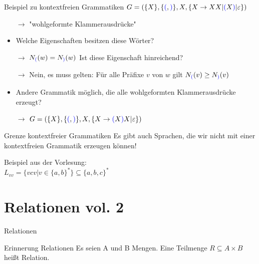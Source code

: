 \begin{frame}{Beispiel zu kontextfreien Grammatiken}
	$G= (\{X\}, \{\textcolor{blue}{(}, \textcolor{blue}{)}\}, X, \{X \rightarrow XX|\textcolor{blue}{(} X \textcolor{blue}{)}| \varepsilon\} )$
	\begin{itemize}
		\pitem Welche Wörter sind ableitbar?
		\pause
		\item[$\rightarrow$] "wohlgeformte Klammerausdrücke"
		\pause
		\item Welche Eigenschaften besitzen diese Wörter?
		\pause
		\item[$\rightarrow$]$N_{\textcolor{blue}{(}}(w) = N_{\textcolor{blue}{)}}(w)$ \pause Ist diese Eigenschaft hinreichend?
		\pause
		\item[$\rightarrow$]Nein, es muss gelten: Für alle Präfixe $v$ von $w$ gilt $ N_{\textcolor{blue}{(}}(v) \geq N_{\textcolor{blue}{)}}(v)$
		\pause
		\item Andere Grammatik möglich, die alle wohlgeformten Klammerausdrücke erzeugt?
		\pause
		\item[$\rightarrow$]  $G= (\{X\}, \{\textcolor{blue}{(}, \textcolor{blue}{)}\}, X, \{X \rightarrow \textcolor{blue}{(} X \textcolor{blue}{)}X| \varepsilon\} )$
	\end{itemize}
\end{frame}

\begin{frame}{Grenze kontextfreier Grammatiken}
	Es gibt auch Sprachen, die wir nicht mit einer kontextfreien Grammatik erzeugen können!
	
	\vspace{.3cm} \bp
	Beispiel aus der Vorlesung:\\
	$L_{vv} = \{vcv| v \in \{a,b\}^*\} \subseteq \{a, b, c\}^*$
\end{frame}


\section{Relationen vol. 2}
\begin{frame}{Relationen}
	\pause
	\begin{block}{Erinnerung Relationen}
		Es seien A und B Mengen. \ip Eine Teilmenge $R \subseteq A \times B$ heißt Relation.
	\end{block}
\end{frame}

